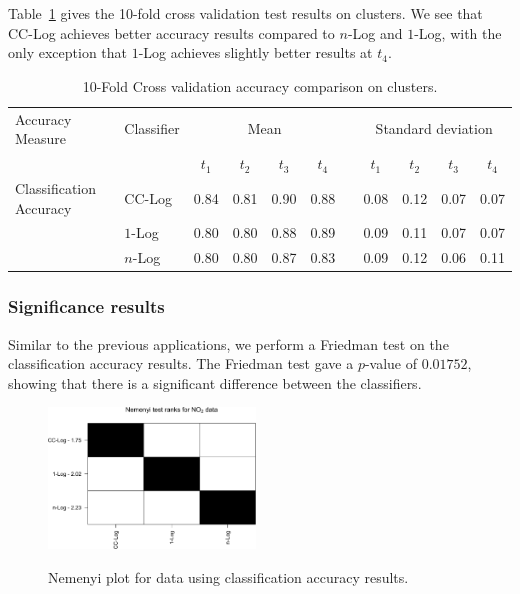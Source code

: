 \documentclass[a4paper,11pt]{article}
\begin{document}
Table~\ref{tab:AverageAccuracyNO2} gives the 10-fold cross validation test results on  clusters. We see that CC-Log achieves better accuracy results compared to $n$-Log and $1$-Log, with the only exception that $1$-Log achieves slightly better results at $t_4$.

\begin{table}[!htb]
	\centering
	\begin{tabular}{llccccccccc}
		\toprule
		Accuracy Measure        & Classifier & \multicolumn{4}{c}{Mean} &       & \multicolumn{4}{c}{Standard deviation}                                            \\
		\cmidrule{3-6} \cmidrule{8-11}
		                        &            & $t_1$                    & $t_2$ & $t_3$                                  & $t_4$ &  & $t_1$ & $t_2$ & $t_3$ & $t_4$ \\
		\midrule
		Classification Accuracy & CC-Log     & 0.84                     & 0.81  & 0.90                                   & 0.88  &  & 0.08  & 0.12  & 0.07  & 0.07  \\
		                        & $1$-Log    & 0.80                     & 0.80  & 0.88                                   & 0.89  &  & 0.09  & 0.11  & 0.07  & 0.07  \\
		                        & $n$-Log    & 0.80                     & 0.80  & 0.87                                   & 0.83  &  & 0.09  & 0.12  & 0.06  & 0.11  \\
		\bottomrule
	\end{tabular}
	\caption{10-Fold Cross validation accuracy comparison on  clusters.}
  \label{tab:AverageAccuracyNO2}
\end{table}

\subsubsection{Significance results}
Similar to the previous applications, we perform a Friedman test on the classification accuracy results. The Friedman test gave a $p$-value of $0.01752$, showing that there is a significant difference between the classifiers.

\begin{figure}[!htb]
	\centering
	\includegraphics[width=0.49\textwidth]{./Graphics/Nemenyi_Accuracy_NO2.pdf}
	\label{fig:Nemenyi_NO21} %
	\caption{Nemenyi plot for  data using classification accuracy results.}
	\label{fig:Nemenyi_NO2}
\end{figure}
\end{document}
